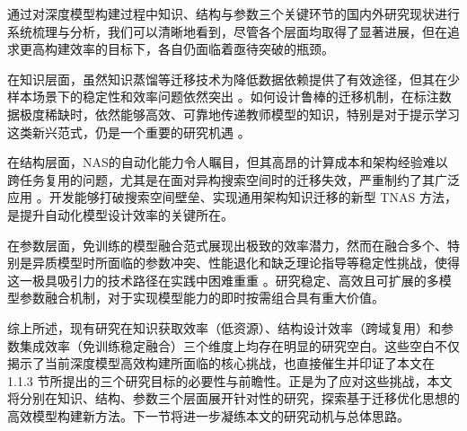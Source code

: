 \documentclass[../main.tex]{subfiles}
\begin{document}

通过对深度模型构建过程中知识、结构与参数三个关键环节的国内外研究现状进行系统梳理与分析，我们可以清晰地看到，尽管各个层面均取得了显著进展，但在追求更高构建效率的目标下，各自仍面临着亟待突破的瓶颈。

在知识层面，虽然知识蒸馏等迁移技术为降低数据依赖提供了有效途径，但其在少样本场景下的稳定性和效率问题依然突出 。如何设计鲁棒的迁移机制，在标注数据极度稀缺时，依然能够高效、可靠地传递教师模型的知识，特别是对于提示学习这类新兴范式，仍是一个重要的研究机遇 。

在结构层面，NAS的自动化能力令人瞩目，但其高昂的计算成本和架构经验难以跨任务复用的问题，尤其是在面对异构搜索空间时的迁移失效，严重制约了其广泛应用 。开发能够打破搜索空间壁垒、实现通用架构知识迁移的新型 TNAS 方法，是提升自动化模型设计效率的关键所在。

在参数层面，免训练的模型融合范式展现出极致的效率潜力，然而在融合多个、特别是异质模型时所面临的参数冲突、性能退化和缺乏理论指导等稳定性挑战，使得这一极具吸引力的技术路径在实践中困难重重 。研究稳定、高效且可扩展的多模型参数融合机制，对于实现模型能力的即时按需组合具有重大价值。

综上所述，现有研究在知识获取效率（低资源）、结构设计效率（跨域复用）和参数集成效率（免训练稳定融合）三个维度上均存在明显的研究空白。这些空白不仅揭示了当前深度模型高效构建所面临的核心挑战，也直接催生并印证了本文在 1.1.3 节所提出的三个研究目标的必要性与前瞻性。正是为了应对这些挑战，本文将分别在知识、结构、参数三个层面展开针对性的研究，探索基于迁移优化思想的高效模型构建新方法。下一节将进一步凝练本文的研究动机与总体思路。
\end{document}
